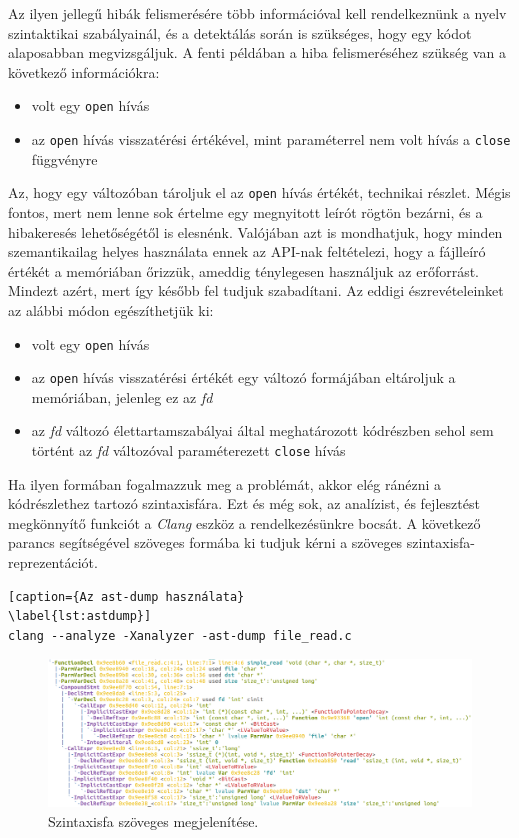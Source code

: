 \documentclass[a4paper,12pt]{report}
\begin{document}
Az ilyen jellegű hibák felismerésére több információval kell rendelkeznünk a nyelv szintaktikai szabályainál, és a detektálás során is szükséges, hogy egy kódot alaposabban megvizsgáljuk. A fenti példában a hiba felismeréséhez szükség van a következő információkra:
\begin{itemize}
\item volt egy \texttt{open} hívás
\item az \texttt{open} hívás visszatérési értékével, mint paraméterrel nem volt hívás a \texttt{close} függvényre
\end{itemize}
Az, hogy egy változóban tároljuk el az \texttt{open} hívás értékét, technikai részlet. Mégis fontos, mert nem lenne sok értelme egy megnyitott leírót rögtön bezárni, és a hibakeresés lehetőségétől is elesnénk.
Valójában azt is mondhatjuk, hogy minden szemantikailag helyes használata ennek az API-nak feltételezi, hogy a fájlleíró értékét a memóriában őrizzük, ameddig ténylegesen használjuk az erőforrást. Mindezt azért, mert így később fel tudjuk szabadítani. Az eddigi észrevételeinket az alábbi módon egészíthetjük ki:
\begin{itemize}
\item volt egy \texttt{open} hívás
\item az \texttt{open} hívás visszatérési értékét egy változó formájában eltároljuk a memóriában, jelenleg ez az \emph{fd}
\item az \emph{fd} változó élettartamszabályai által meghatározott kódrészben sehol sem történt az \emph{fd} változóval paraméterezett \texttt{close} hívás
\end{itemize}
Ha ilyen formában fogalmazzuk meg a problémát, akkor elég ránézni a kódrészlethez tartozó szintaxisfára. Ezt és még sok, az analízist, és fejlesztést megkönnyítő funkciót a \emph{Clang} eszköz a rendelkezésünkre bocsát. A következő parancs segítségével szöveges formába ki tudjuk kérni a szöveges szintaxisfa-reprezentációt.
\begin{lstlisting}[caption={Az ast-dump használata}
\label{lst:astdump}]
clang --analyze -Xanalyzer -ast-dump file_read.c
\end{lstlisting}

\begin{figure}[h]
\centering
\includegraphics[scale=0.27]{astdumptomorrow.png}
\caption{Szintaxisfa szöveges megjelenítése.}
\end{figure}
\end{document}
